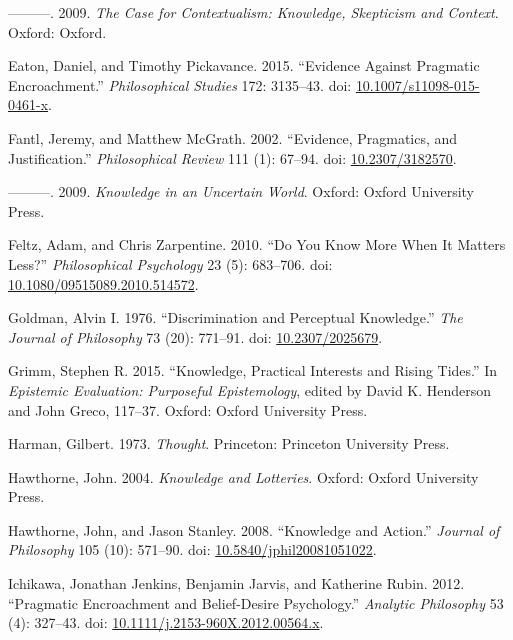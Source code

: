 \documentclass[
  10pt,
  letterpaper,
  DIV=11,
  numbers=noendperiod,
  twoside]{scrartcl}
\newlength{\cslhangindent}
\newenvironment{CSLReferences}[2] %
 {\begin{list}{}{%
  \setlength{\itemindent}{0pt}
  \setlength{\leftmargin}{0pt}
  \setlength{\parsep}{0pt}
  \ifodd #1
   \setlength{\leftmargin}{\cslhangindent}
   \setlength{\itemindent}{-1\cslhangindent}
  \fi
  \setlength{\itemsep}{#2\baselineskip}}}
 {\end{list}}
\begin{document}
\begin{CSLReferences}{1}{0}
---------. 2009. \emph{The Case for Contextualism: Knowledge, Skepticism
and Context}. Oxford: Oxford.

Eaton, Daniel, and Timothy Pickavance. 2015. {``Evidence Against
Pragmatic Encroachment.''} \emph{Philosophical Studies} 172: 3135--43.
doi:
\href{https://doi.org/10.1007/s11098-015-0461-x}{10.1007/s11098-015-0461-x}.

Fantl, Jeremy, and Matthew McGrath. 2002. {``Evidence, Pragmatics, and
Justification.''} \emph{Philosophical Review} 111 (1): 67--94. doi:
\href{https://doi.org/10.2307/3182570}{10.2307/3182570}.

---------. 2009. \emph{Knowledge in an Uncertain World}. Oxford: Oxford
University Press.

Feltz, Adam, and Chris Zarpentine. 2010. {``Do You Know More When It
Matters Less?''} \emph{Philosophical Psychology} 23 (5): 683--706. doi:
\href{https://doi.org/10.1080/09515089.2010.514572}{10.1080/09515089.2010.514572}.

Goldman, Alvin I. 1976. {``Discrimination and Perceptual Knowledge.''}
\emph{The Journal of Philosophy} 73 (20): 771--91. doi:
\href{https://doi.org/10.2307/2025679}{10.2307/2025679}.

Grimm, Stephen R. 2015. {``Knowledge, Practical Interests and Rising
Tides.''} In \emph{Epistemic Evaluation: Purposeful Epistemology},
edited by David K. Henderson and John Greco, 117--37. Oxford: Oxford
University Press.

Harman, Gilbert. 1973. \emph{Thought}. Princeton: Princeton University
Press.

Hawthorne, John. 2004. \emph{Knowledge and Lotteries}. Oxford: Oxford
University Press.

Hawthorne, John, and Jason Stanley. 2008. {``{Knowledge and Action}.''}
\emph{Journal of Philosophy} 105 (10): 571--90. doi:
\href{https://doi.org/10.5840/jphil20081051022}{10.5840/jphil20081051022}.

Ichikawa, Jonathan Jenkins, Benjamin Jarvis, and Katherine Rubin. 2012.
{``Pragmatic Encroachment and Belief-Desire Psychology.''}
\emph{Analytic Philosophy} 53 (4): 327--43. doi:
\href{https://doi.org/10.1111/j.2153-960X.2012.00564.x}{10.1111/j.2153-960X.2012.00564.x}.


\end{CSLReferences}
\end{document}
